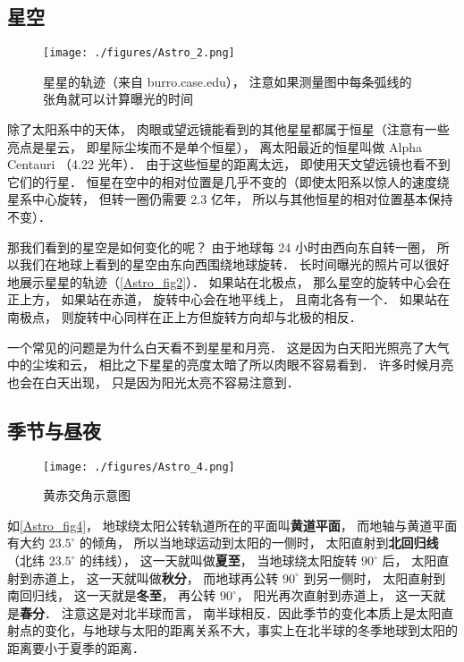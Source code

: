 \subsection{星空}

\begin{figure}[ht]
\centering
\texttt{[image: ./figures/Astro\_2.png]}
\caption{星星的轨迹（来自 burro.case.edu）， 注意如果测量图中每条弧线的张角就可以计算曝光的时间} \label{Astro_fig2}
\end{figure}

除了太阳系中的天体， 肉眼或望远镜能看到的其他星星都属于恒星（注意有一些亮点是星云， 即星际尘埃而不是单个恒星）， 离太阳最近的恒星叫做 Alpha Centauri （4.22 光年）． 由于这些恒星的距离太远， 即使用天文望远镜也看不到它们的行星． 恒星在空中的相对位置是几乎不变的（即使太阳系以惊人的速度绕星系中心旋转， 但转一圈仍需要 2.3 亿年， 所以与其他恒星的相对位置基本保持不变）．

那我们看到的星空是如何变化的呢？ 由于地球每 24 小时由西向东自转一圈， 所以我们在地球上看到的星空由东向西围绕地球旋转． 长时间曝光的照片可以很好地展示星星的轨迹（\autoref{Astro_fig2}）． 如果站在北极点， 那么星空的旋转中心会在正上方， 如果站在赤道， 旋转中心会在地平线上， 且南北各有一个． 如果站在南极点， 则旋转中心同样在正上方但旋转方向却与北极的相反．

一个常见的问题是为什么白天看不到星星和月亮． 这是因为白天阳光照亮了大气中的尘埃和云， 相比之下星星的亮度太暗了所以肉眼不容易看到． 许多时候月亮也会在白天出现， 只是因为阳光太亮不容易注意到．

\subsection{季节与昼夜}

\begin{figure}[ht]
\centering
\texttt{[image: ./figures/Astro\_4.png]}
\caption{黄赤交角示意图} \label{Astro_fig4}
\end{figure}

如\autoref{Astro_fig4}， 地球绕太阳公转轨道所在的平面叫\textbf{黄道平面}， 而地轴与黄道平面有大约 $23.5^\circ$ 的倾角， 所以当地球运动到太阳的一侧时， 太阳直射到\textbf{北回归线}（北纬 $23.5^\circ$ 的纬线）， 这一天就叫做\textbf{夏至}， 当地球绕太阳旋转 $90^\circ$ 后， 太阳直射到赤道上， 这一天就叫做\textbf{秋分}， 而地球再公转 $90^\circ$ 到另一侧时， 太阳直射到南回归线， 这一天就是\textbf{冬至}， 再公转 $90^\circ$， 阳光再次直射到赤道上， 这一天就是\textbf{春分}． 注意这是对北半球而言， 南半球相反．因此季节的变化本质上是太阳直射点的变化，与地球与太阳的距离关系不大，事实上在北半球的冬季地球到太阳的距离要小于夏季的距离． 

